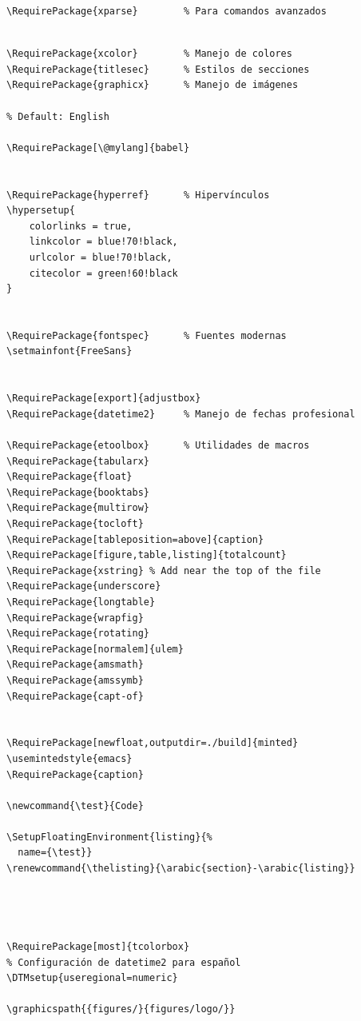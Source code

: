 \documentclass[english]{reporti}
\begin{document}
\begin{verbatim}
\RequirePackage{xparse}        % Para comandos avanzados
\end{verbatim}

\begin{verbatim}

\RequirePackage{xcolor}        % Manejo de colores
\RequirePackage{titlesec}      % Estilos de secciones
\RequirePackage{graphicx}      % Manejo de imágenes

% Default: English

\RequirePackage[\@mylang]{babel}


\RequirePackage{hyperref}      % Hipervínculos
\hypersetup{
    colorlinks = true,
    linkcolor = blue!70!black,
    urlcolor = blue!70!black,
    citecolor = green!60!black
}


\RequirePackage{fontspec}      % Fuentes modernas
\setmainfont{FreeSans}


\RequirePackage[export]{adjustbox}
\RequirePackage{datetime2}     % Manejo de fechas profesional

\RequirePackage{etoolbox}      % Utilidades de macros
\RequirePackage{tabularx}
\RequirePackage{float}
\RequirePackage{booktabs}
\RequirePackage{multirow}
\RequirePackage{tocloft}
\RequirePackage[tableposition=above]{caption}
\RequirePackage[figure,table,listing]{totalcount}
\RequirePackage{xstring} % Add near the top of the file
\RequirePackage{underscore}
\RequirePackage{longtable}
\RequirePackage{wrapfig}
\RequirePackage{rotating}
\RequirePackage[normalem]{ulem}
\RequirePackage{amsmath}
\RequirePackage{amssymb}
\RequirePackage{capt-of}


\RequirePackage[newfloat,outputdir=./build]{minted}
\usemintedstyle{emacs}
\RequirePackage{caption}

\newcommand{\test}{Code}

\SetupFloatingEnvironment{listing}{%
  name={\test}}
\renewcommand{\thelisting}{\arabic{section}-\arabic{listing}}




\RequirePackage[most]{tcolorbox}
% Configuración de datetime2 para español
\DTMsetup{useregional=numeric}

\graphicspath{{figures/}{figures/logo/}}
\end{verbatim}
\end{document}
